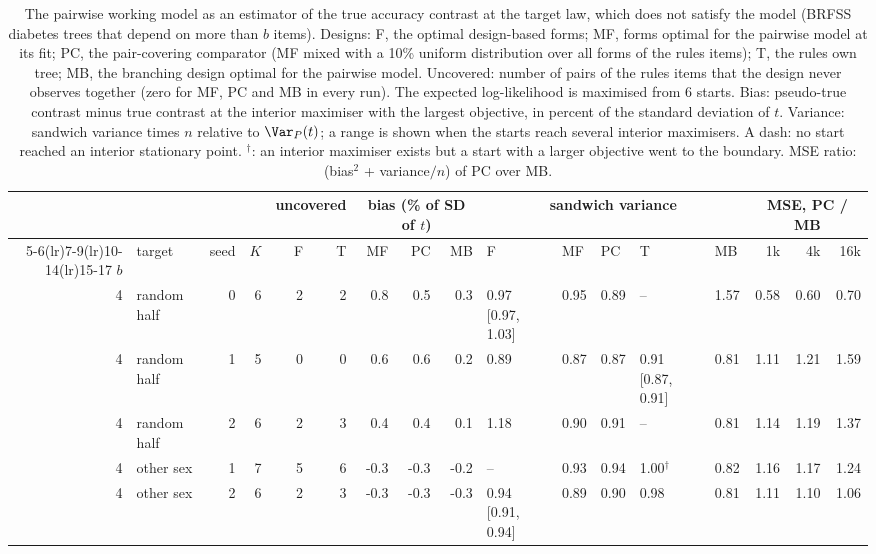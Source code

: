 \begin{table}[h]
\centering
\caption{The pairwise working model as an estimator of the true accuracy contrast at the target law, which does not satisfy the model (BRFSS diabetes trees that depend on more than $b$ items). Designs: F, the optimal design-based forms; MF, forms optimal for the pairwise model at its fit; PC, the pair-covering comparator (MF mixed with a 10\% uniform distribution over all forms of the rule\textquotesingle s items); T, the rule\textquotesingle s own tree; MB, the branching design optimal for the pairwise model. Uncovered: number of pairs of the rule\textquotesingle s items that the design never observes together (zero for MF, PC and MB in every run). The expected log-likelihood is maximised from 6 starts. Bias: pseudo-true contrast minus true contrast at the interior maximiser with the largest objective, in percent of the standard deviation of $t$. Variance: sandwich variance times $n$ relative to $\Var_P(t)$; a range is shown when the starts reach several interior maximisers. A dash: no start reached an interior stationary point. $^\dagger$: an interior maximiser exists but a start with a larger objective went to the boundary. MSE ratio: (bias$^2$ + variance$/n$) of PC over MB.}
\label{tab:misspec}
\scriptsize
\setlength{\tabcolsep}{2.4pt}
\begin{tabular}{rlrr rr rrr lllll rrr}
\toprule
 & & & & \multicolumn{2}{c}{uncovered} & \multicolumn{3}{c}{bias (\% of SD of $t$)} & \multicolumn{5}{c}{sandwich variance} & \multicolumn{3}{c}{MSE, PC / MB} \\
\cmidrule(lr){5-6}\cmidrule(lr){7-9}\cmidrule(lr){10-14}\cmidrule(lr){15-17}
$b$ & target & seed & $K$ & F & T & MF & PC & MB & F & MF & PC & T & MB & 1k & 4k & 16k \\
\midrule
4 & random half & 0 & 6 & 2 & 2 & 0.8 & 0.5 & 0.3 & 0.97 [0.97, 1.03] & 0.95 & 0.89 & -- & 1.57 & 0.58 & 0.60 & 0.70 \\
4 & random half & 1 & 5 & 0 & 0 & 0.6 & 0.6 & 0.2 & 0.89 & 0.87 & 0.87 & 0.91 [0.87, 0.91] & 0.81 & 1.11 & 1.21 & 1.59 \\
4 & random half & 2 & 6 & 2 & 3 & 0.4 & 0.4 & 0.1 & 1.18 & 0.90 & 0.91 & -- & 0.81 & 1.14 & 1.19 & 1.37 \\
4 & other sex & 1 & 7 & 5 & 6 & -0.3 & -0.3 & -0.2 & -- & 0.93 & 0.94 & 1.00$^\dagger$ & 0.82 & 1.16 & 1.17 & 1.24 \\
4 & other sex & 2 & 6 & 2 & 3 & -0.3 & -0.3 & -0.3 & 0.94 [0.91, 0.94] & 0.89 & 0.90 & 0.98 & 0.81 & 1.11 & 1.10 & 1.06 \\

\end{tabular}
\end{table}
